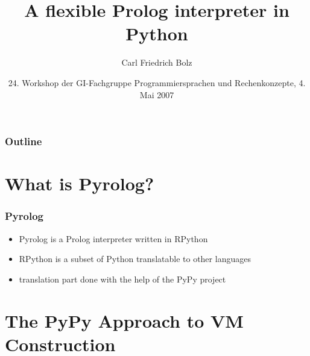 \documentclass[utf8]{beamer}
\title{A flexible Prolog interpreter in Python}
\author{Carl Friedrich Bolz}
\institute[Heinrich-Heine-Universität Düsseldorf]
{
  Institut für Informatik\\
  Heinrich-Heine-Universität Düsseldorf
}
\date{24. Workshop der GI-Fachgruppe Programmiersprachen und Rechenkonzepte, 4. Mai 2007}
\begin{document}
\begin{frame}
  \titlepage
\end{frame}

\begin{frame}
  \frametitle{Outline}
  \tableofcontents
\end{frame}





\section{What is Pyrolog?}

\begin{frame}
  \frametitle{Pyrolog}

  \begin{itemize}
  \item
    Pyrolog is a Prolog interpreter written in RPython
  \item
    RPython is a subset of Python translatable to other languages
  \item
    translation part done with the help of the PyPy project
  \end{itemize}
\end{frame}

\section{The PyPy Approach to VM Construction}
\end{document}
